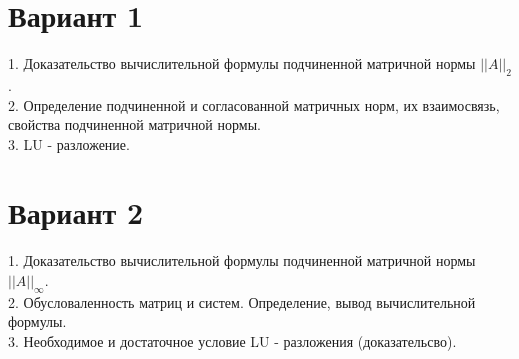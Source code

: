 \documentclass[14pt, titlepage,fleqn]{extarticle}
\begin{document}
	

	
	
	\newpage
	
	\clearpage
	\section*{Вариант 1}
	1. Доказательство вычислительной формулы  подчиненной  матричной  нормы $||A||_2$.\\
	2. Определение подчиненной и согласованной матричных норм, их взаимосвязь, свойства подчиненной матричной нормы.\\
	3. LU - разложение.


	\section*{Вариант 2}
	1. Доказательство вычислительной формулы  подчиненной  матричной  нормы $||A||_\infty$.\\
	2. Обусловаленность матриц и систем. Определение, вывод вычислительной формулы.\\	
	3. Необходимое и достаточное условие LU - разложения (доказательсво).



	
	
	\newpage
	
	
\end{document}
